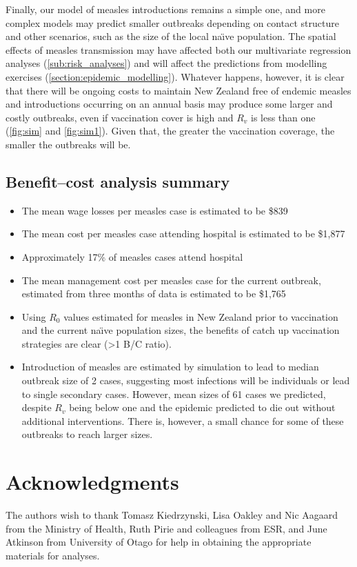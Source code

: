 \documentclass{article}
\begin{document}
Finally, our model of measles introductions remains a simple one, and more complex models may predict smaller outbreaks depending on contact structure and other scenarios, such as the size of the local na\"{\i}ve population. The spatial effects of measles transmission may have affected both our multivariate regression analyses (\autoref{sub:risk_analyses}) and will affect the predictions from modelling exercises (\autoref{section:epidemic_modelling}). Whatever happens, however, it is clear that there will be ongoing costs to maintain New Zealand free of endemic measles and introductions occurring on an annual basis may produce some larger and costly outbreaks, even if vaccination cover is high and $R_v$ is less than one (\autoref{fig:sim} and \autoref{fig:sim1}). Given that, the greater the vaccination coverage, the smaller the outbreaks will be.

\subsection{Benefit--cost analysis summary}
\begin{itemize}
\item The mean wage losses per measles case is estimated to be \$839
\item The mean cost per measles case attending hospital is estimated to be \$1,877
\item Approximately 17\% of measles cases attend hospital
\item The mean management cost per measles case for the current outbreak, estimated from three months of data is estimated to be \$1,765
\item Using $R_0$ values estimated for measles in New Zealand prior to vaccination and the current na\"{\i}ve population sizes, the benefits of catch up vaccination strategies are clear (>1 B/C ratio).
\item Introduction of measles are estimated by simulation to lead to median outbreak size of 2 cases, suggesting most infections will be individuals or lead to single secondary cases. However, mean sizes of 61 cases we predicted, despite $R_v$ being below one and the epidemic predicted to die out without additional interventions. There is, however, a small chance for some of these outbreaks to reach larger sizes.
\end{itemize}

\section{Acknowledgments}
The authors wish to thank Tomasz Kiedrzynski, Lisa Oakley and Nic Aagaard from the Ministry of Health, Ruth Pirie and colleagues from ESR, and June Atkinson from University of Otago for help in obtaining the appropriate materials for analyses.
\end{document}
